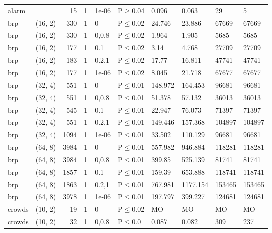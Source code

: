 \begin{longtable}{llrrllllll}
 alarm         &          &     	15 & 1 & 1e-06 & P$\geq$0.04  & 0.096   & 0.063    & 29     & 5      \\
 brp           & (16, 2)  &    	330 & 1 & 0     & P$\leq$0.02  & 24.746  & 23.886   & 67669  & 67669  \\
 brp           & (16, 2)  &    	330 & 1 & 0,0.8 & P$\leq$0.02  & 1.964   & 1.905    & 5685   & 5685   \\
 brp           & (16, 2)  &    	177 & 1 & 0.1   & P$\leq$0.02  & 3.14    & 4.768    & 27709  & 27709  \\
 brp           & (16, 2)  &    	183 & 1 & 0.2,1 & P$\leq$0.02  & 17.77   & 16.811   & 47741  & 47741  \\
 brp           & (16, 2)  &    	177 & 1 & 1e-06 & P$\leq$0.02  & 8.045   & 21.718   & 67677  & 67677  \\
 brp           & (32, 4)  &    	551 & 1 & 0     & P$\leq$0.01  & 148.972 & 164.453  & 96681  & 96681  \\
 brp           & (32, 4)  &    	551 & 1 & 0,0.8 & P$\leq$0.01  & 51.378  & 57.132   & 36013  & 36013  \\
 brp           & (32, 4)  &    	545 & 1 & 0.1   & P$\leq$0.01  & 22.947  & 76.073   & 71397  & 71397  \\
 brp           & (32, 4)  &    	551 & 1 & 0.2,1 & P$\leq$0.01  & 149.446 & 157.368  & 104897 & 104897 \\
 brp           & (32, 4)  &   	1094 & 1 & 1e-06 & P$\leq$0.01  & 33.502  & 110.129  & 96681  & 96681  \\
 brp           & (64, 8)  &   	3984 & 1 & 0     & P$\leq$0.01  & 557.982 & 946.884  & 118281 & 118281 \\
 brp           & (64, 8)  &   	3984 & 1 & 0,0.8 & P$\leq$0.01  & 399.85  & 525.139  & 81741  & 81741  \\
 brp           & (64, 8)  &   	1857 & 1 & 0.1   & P$\leq$0.01  & 159.39  & 653.888  & 118741 & 118741 \\
 brp           & (64, 8)  &   	1863 & 1 & 0.2,1 & P$\leq$0.01  & 767.981 & 1177.154 & 153465 & 153465 \\
 brp           & (64, 8)  &   	3978 & 1 & 1e-06 & P$\leq$0.01  & 197.797 & 399.227  & 124681 & 124681 \\
 crowds        & (10, 2)  &     	19 & 1 & 0     & P$\leq$0.02  & MO      & MO       & MO     & MO     \\
 crowds        & (10, 2)  &     	32 & 1 & 0,0.8 & P$\leq$0.0   & 0.087   & 0.082    & 309    & 237    \\

\end{longtable}
